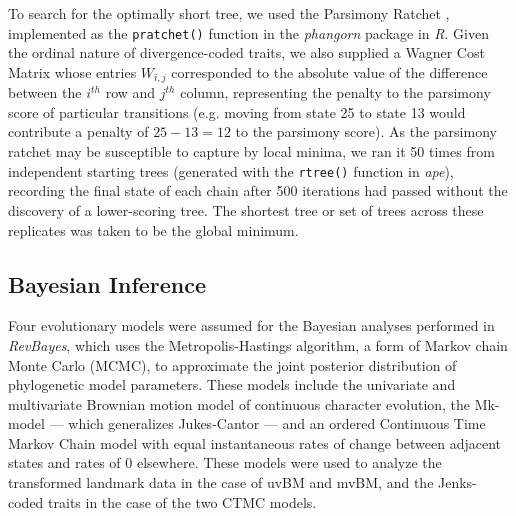To search for the optimally short tree, we used the Parsimony Ratchet \citep{nixonParsimonyRatchetNew1999}, implemented as the \texttt{pratchet()} function in the \textit{phangorn} package in \textit{R}. Given the ordinal nature of divergence-coded traits, we also supplied a Wagner Cost Matrix whose entries $W_{i,j}$ corresponded to the absolute value of the difference between the $i^{th}$ row and $j^{th}$ column, representing the penalty to the parsimony score of particular transitions (e.g. moving from state 25 to state 13 would contribute a penalty of $25 - 13 = 12$ to the parsimony score). As the parsimony ratchet may be susceptible to capture by local minima, we ran it 50 times from independent starting trees (generated with the \texttt{rtree()} function in \textit{ape}), recording the final state of each chain after 500 iterations had passed without the discovery of a lower-scoring tree. The shortest tree or set of trees across these replicates was taken to be the global minimum.

\subsection{Bayesian Inference}

Four evolutionary models were assumed for the Bayesian analyses performed in \textit{RevBayes}, which uses the Metropolis-Hastings algorithm, a form of Markov chain Monte Carlo (MCMC), to approximate the joint posterior distribution of phylogenetic model parameters. These models include the univariate and multivariate Brownian motion model of continuous character evolution, the Mk-model --- which generalizes Jukes-Cantor --- and an ordered Continuous Time Markov Chain model with equal instantaneous rates of change between adjacent states and rates of 0 elsewhere. These models were used to analyze the transformed landmark data in the case of uvBM and mvBM, and the Jenks-coded traits in the case of the two CTMC models.

